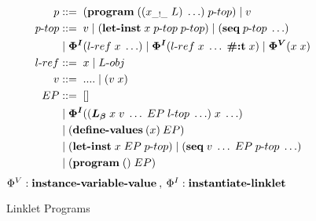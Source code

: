 \documentclass[sigplan,screen,anonymous]{acmart}
\def\dash {\text{-}}
\begin{document}
\begin{figure}[h!]
  \begin{align*}
    p           &::=\; (\textbf{program}\; ((x_{\_!\_}\; L)\; \ldots)\; p\dash top)\; |\; v \\
    p\dash top  &::=\; v\; |\; (\textbf{let\dash inst}\; x\; p\dash top\;p\dash top)\; |\; (\textbf{seq}\; p\dash top\; \ldots) \\
    \;          &\;|\; \bm{\Phi^I}(l\dash ref\; x\; \ldots)\; |\; \bm{\Phi^I}(l\dash ref\; x\; \ldots\; \textbf{\#:t}\; x)\; |\; \bm{\Phi^V}(x\; x) \\
    l\dash ref &::=\; x\; |\; L\dash obj \\
    v           &::=\; ....\;|\;(v\;x) \\
    EP          &::=\; [] \\
    \;          &\;|\; \bm{\Phi^I}((\lb\; x\; v\; \ldots\; EP\; l\dash top\; \ldots)\; x\; \ldots) \\
    \;          &\;|\; (\textbf{define\dash values}\:(x)\:EP) \\
    \;          &\;|\; (\textbf{let\dash inst}\; x\; EP\; p\dash top)\; |\; (\textbf{seq}\; v\; \ldots\; EP\; p\dash top\; \ldots) \\
    \;          &\;|\; (\textbf{program}\; ()\; EP) \\
  \end{align*}
  \hfill \footnotesize $\Phi^V : \textbf{instance\dash variable\dash value}\:,\: \Phi^I : \textbf{instantiate\dash linklet}$
\caption{Linklet Programs}
\label{fig:linklet-program}
\end{figure}

\newcommand{\redinput}[1]{EP\;\llbracket #1 \rrbracket, \rho, \sigma\;}
\newcommand{\redoutput}[3]{EP\;\llbracket #1 \rrbracket, #2, #3\;}

\newcommand{\rcinput}[1]{EP\;\llbracket E\;\llbracket #1 \rrbracket \rrbracket, \rho, \sigma\;}
\newcommand{\rcoutput}[3]{EP\;\llbracket E\;\llbracket #1 \rrbracket \rrbracket, #2, #3\;}
\def\rcrel {&\longrightarrow_{\beta r}\;}

\def\where {\textbf{where}\;}
\def\rel {&\longrightarrow_{\beta p}\;}
\end{document}
